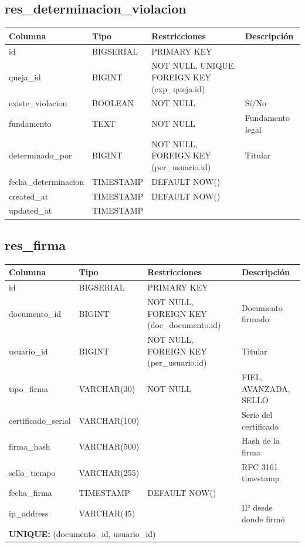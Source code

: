 \documentclass[12pt, a4paper]{article}
\begin{document}
\subsection{res\_determinacion\_violacion}
\begin{longtable}{|p{3.5cm}|p{2.5cm}|p{3cm}|p{5cm}|}
    \hline
    \rowcolor[gray]{0.9}
    \textbf{Columna} & \textbf{Tipo} & \textbf{Restricciones} & \textbf{Descripción} \\
    \hline
    id & BIGSERIAL & PRIMARY KEY & \\
    \hline
    queja\_id & BIGINT & NOT NULL, UNIQUE, FOREIGN KEY (exp\_queja.id) & \\
    \hline
    existe\_violacion & BOOLEAN & NOT NULL & Sí/No \\
    \hline
    fundamento & TEXT & NOT NULL & Fundamento legal \\
    \hline
    determinado\_por & BIGINT & NOT NULL, FOREIGN KEY (per\_usuario.id) & Titular \\
    \hline
    fecha\_determinacion & TIMESTAMP & DEFAULT NOW() & \\
    \hline
    created\_at & TIMESTAMP & DEFAULT NOW() & \\
    \hline
    updated\_at & TIMESTAMP & & \\
    \hline
\end{longtable}

\subsection{res\_firma}
\begin{longtable}{|p{3.5cm}|p{2.5cm}|p{3cm}|p{5cm}|}
    \hline
    \rowcolor[gray]{0.9}
    \textbf{Columna} & \textbf{Tipo} & \textbf{Restricciones} & \textbf{Descripción} \\
    \hline
    id & BIGSERIAL & PRIMARY KEY & \\
    \hline
    documento\_id & BIGINT & NOT NULL, FOREIGN KEY (doc\_documento.id) & Documento firmado \\
    \hline
    usuario\_id & BIGINT & NOT NULL, FOREIGN KEY (per\_usuario.id) & Titular \\
    \hline
    tipo\_firma & VARCHAR(30) & NOT NULL & FIEL, AVANZADA, SELLO \\
    \hline
    certificado\_serial & VARCHAR(100) & & Serie del certificado \\
    \hline
    firma\_hash & VARCHAR(500) & & Hash de la firma \\
    \hline
    sello\_tiempo & VARCHAR(255) & & RFC 3161 timestamp \\
    \hline
    fecha\_firma & TIMESTAMP & DEFAULT NOW() & \\
    \hline
    ip\_address & VARCHAR(45) & & IP desde donde firmó \\
    \hline
    \multicolumn{4}{|p{14cm}|}{\cellcolor[gray]{0.95} \textbf{UNIQUE:} (documento\_id, usuario\_id)} \\
    \hline
\end{longtable}
\end{document}

